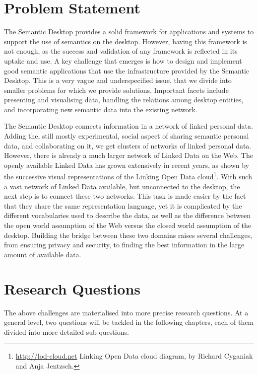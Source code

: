 \section{Problem Statement}
\label{sec:problem}

The Semantic Desktop provides a solid framework for applications and systems to support the use of semantics on the desktop. However, having this framework is not enough, as the success and validation of any framework is reflected in its uptake and use. A key challenge that emerges is how to design and implement good semantic applications that use the infrastructure provided by the Semantic Desktop. This is a very vague and underspecified issue, that we divide into smaller problems for which we provide solutions. Important facets include presenting and visualising data, handling the relations among desktop entities, and incorporating new semantic data into the existing network.

The Semantic Desktop connects information in a network of linked personal data. Adding the, still mostly experimental, social aspect of sharing semantic personal data, and collaborating on it, we get clusters of networks of linked personal data. However, there is already a much larger network of Linked Data on the Web. The openly available Linked Data has grown extensively in recent years, as shown by the successive visual representations of the Linking Open Data cloud\footnote{\url{http://lod-cloud.net} Linking Open Data cloud diagram, by Richard Cyganiak and Anja Jentzsch.}. 
With such a vast network of Linked Data available, but unconnected to the desktop, the next step is to connect these two networks. This task is made easier by the fact that they share the same representation language, yet it is complicated by the different vocabularies used to describe the data, as well as the difference between the open world assumption of the Web versus the closed world assumption of the desktop. Building the bridge between these two domains raises several challenges, from ensuring privacy and security, to finding the best information in the large amount of available data.

\section{Research Questions}
\label{sub:question}

The above challenges are materialised into more precise research questions. At a general level, two questions will be tackled in the following chapters, each of them divided into more detailed sub-questions.

